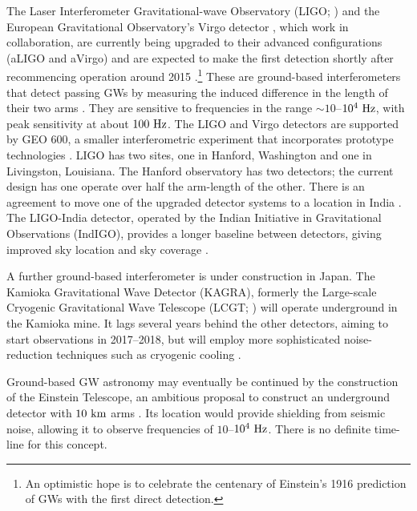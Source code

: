 The Laser Interferometer Gravitational-wave Observatory (LIGO; \citealt{Abramovici1992}) and the European Gravitational Observatory's Virgo detector \citep{Acernese2008a}, which work in collaboration, are currently being upgraded to their advanced configurations (aLIGO and aVirgo) and are expected to make the first detection shortly after recommencing operation around 2015 \citep{Harry2010,Accadia2011}.\footnote{An optimistic hope is to celebrate the centenary of Einstein's 1916 prediction of GWs \citep[document 32]{Einstein1997} with the first direct detection.} These are ground-based interferometers that detect passing GWs by measuring the induced difference in the length of their two arms \citep{Pitkin2011}. They are sensitive to frequencies in the range $\sim10$--$10^4~\mathrm{Hz}$, with peak sensitivity at about $100~\mathrm{Hz}$. The LIGO and Virgo detectors are supported by GEO 600, a smaller interferometric experiment that incorporates prototype technologies \citep{Willke2002,Willke2006}. LIGO has two sites, one in Hanford, Washington and one in Livingston, Louisiana. The Hanford observatory has two detectors; the current design has one operate over half the arm-length of the other. There is an agreement to move one of the upgraded detector systems to a location in India \citep{Unnikrishnan2013}. The LIGO-India detector, operated by the Indian Initiative in Gravitational Observations (IndIGO), provides a longer baseline between detectors, giving improved sky location and sky coverage \citep{Schutz2011}.

A further ground-based interferometer is under construction in Japan. The Kamioka Gravitational Wave Detector (KAGRA), formerly the Large-scale Cryogenic Gravitational Wave Telescope (LCGT; \citealt{Kuroda1999,Kuroda2010}) will operate underground in the Kamioka mine. It lags several years behind the other detectors, aiming to start observations in 2017--2018, but will employ more sophisticated noise-reduction techniques such as cryogenic cooling \citep{Somiya2012}.

Ground-based GW astronomy may eventually be continued by the construction of the Einstein Telescope, an ambitious proposal to construct an underground detector with $10~\mathrm{km}$ arms \citep{Punturo2010,Hild2011,Sathyaprakash2012}. Its location would provide shielding from seismic noise, allowing it to observe frequencies of $10$--$10^4~\mathrm{Hz}$. There is no definite time-line for this concept.

